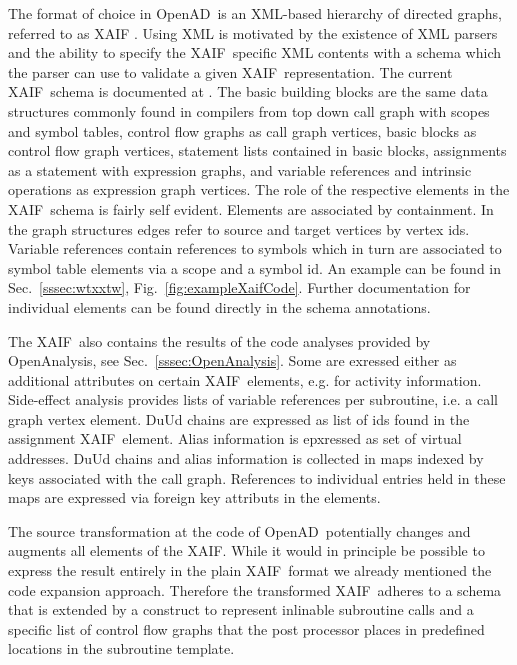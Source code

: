\documentclass[11pt]{article}
\newcommand{\OpenAD}{OpenAD}
\newcommand{\OpenAnalysis}{OpenAnalysis}
\newcommand{\xaif}{XAIF}
\newcommand{\refsec}[1]{{Sec.~\ref{#1}}}
\newcommand{\reffig}[1]{{Fig.~\ref{#1}}}
\begin{document}
The format of choice in \OpenAD\ is an XML-based \cite{xmlWeb} hierarchy of 
directed graphs, referred to as \xaif 
\cite{HNN02}. Using XML is motivated by the existence of XML parsers and 
the ability to specify the \xaif\ specific XML contents with a schema which 
the parser can use to validate a given \xaif\ representation. 
The current \xaif\ schema is documented at \cite{xaifweb}.
The basic building blocks are the same data structures commonly found 
in compilers from top down call graph with scopes and symbol tables, 
control flow graphs as call graph vertices, basic blocks  as control flow 
graph vertices, statement lists contained in basic blocks, 
assignments as a statement with expression graphs,  and variable references 
and intrinsic operations as expression graph vertices. 
The role of the respective elements in the \xaif\ schema is fairly self evident. 
Elements are associated by containment. In the graph structures edges 
refer to source and target vertices by vertex ids. 
Variable references contain references to symbols which in turn 
are associated to symbol table elements via a scope and a symbol id. 
An example can be found in \refsec{sssec:wtxxtw}, \reffig{fig:exampleXaifCode}.
Further documentation for individual elements can be found directly in the 
schema annotations. 

The \xaif\ also contains the results of the code analyses provided 
by \OpenAnalysis, see \refsec{sssec:OpenAnalysis}. Some are exressed 
either as additional attributes on certain \xaif\ elements, e.g. for activity information. 
Side-effect analysis provides lists of variable references per subroutine, i.e. a call graph vertex element.
DuUd chains are expressed as list of ids found in the assignment \xaif\ element.
Alias information is epxressed as set of virtual addresses. 
DuUd chains and alias information is collected in maps indexed by keys associated with the call 
graph. References to individual entries held in these maps are expressed via foreign key 
attributs in the elements. 

The source transformation at the code of \OpenAD\ potentially changes and augments 
all elements of the \xaif. While it would in principle be possible  
to express the result entirely in the plain \xaif\ format we already mentioned the 
code expansion approach. Therefore the transformed \xaif\ adheres to a schema 
that is extended by a construct to represent inlinable subroutine calls and 
a specific list of control flow graphs that the post processor places in predefined 
locations in the subroutine template.    
\end{document}
